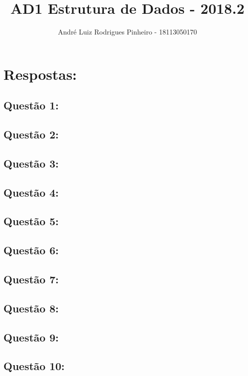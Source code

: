 \documentclass[a4paper,11pt]{article}
\title{AD1 Estrutura de Dados - 2018.2}
\author{André Luiz Rodrigues Pinheiro - 18113050170}
\begin{document}
\maketitle

\section*{Respostas:}

\subsection*{Questão 1:}


\subsection*{Questão 2:}


\subsection*{Questão 3:}


\subsection*{Questão 4:}


\subsection*{Questão 5:}
%

\subsection*{Questão 6:}
%

\subsection*{Questão 7:}
%

\subsection*{Questão 8:}


\subsection*{Questão 9:}


\subsection*{Questão 10:}

%
\end{document}
